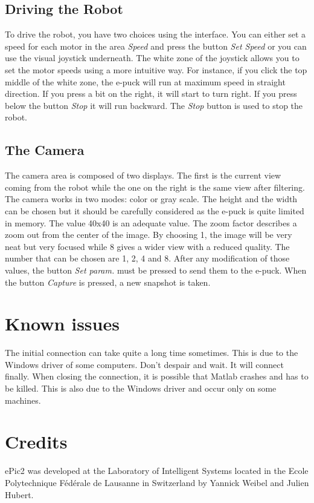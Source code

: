 \documentclass[11pt,oneside,english,a4paper]{article}
\begin{document}
\subsection{Driving the Robot}
To drive the robot, you have two choices using the interface. You can either set a speed for each motor in the area \emph{Speed} and press the button \emph{Set Speed} or you can use the visual joystick underneath. The white zone of the joystick allows you to set the motor speeds using a more intuitive way. For instance, if you click the top middle of the white zone, the e-puck will run at maximum speed in straight direction. If you press a bit on the right, it will start to turn right. If you press below the button \emph{Stop} it will run backward. The \emph{Stop} button is used to stop the robot. 

\subsection{The Camera}
The camera area is composed of two displays. The first is the current view coming from the robot while the one on the right is the same view after filtering. The camera works in two modes: color or gray scale. The height and the width can be chosen but it should be carefully considered as the e-puck is quite limited in memory. The value 40x40 is an adequate value. The zoom factor describes a zoom out from the center of the image. By choosing 1, the image will be very neat but very focused while 8 gives a wider view with a reduced quality. The number that can be chosen are 1, 2, 4 and 8. After any modification of those values, the button \emph{Set param.} must be pressed to send them to the e-puck. When the button \emph{Capture} is pressed, a new snapshot is taken.

\section{Known issues}
The initial connection can take quite a long time sometimes. This is due to the Windows driver of some computers. Don't despair and wait. It will connect finally. When closing the connection, it is possible that Matlab crashes and has to be killed. This is also due to the Windows driver and occur only on some machines.

\section{Credits}
ePic2 was developed at the Laboratory of Intelligent Systems located in the Ecole Polytechnique F\'ed\'erale de Lausanne in Switzerland by Yannick Weibel and Julien Hubert.
\end{document}

